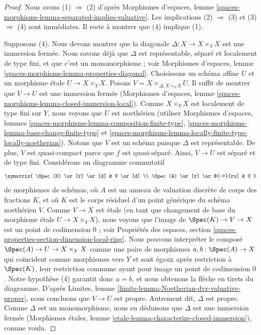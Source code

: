 \begin{proof}
Nous avons (1) $\Rightarrow$ (2) d'après
Morphismes d'espaces, lemme
\ref{spaces-morphisms-lemma-separated-implies-valuative}.
Les implications (2) $\Rightarrow$ (3) et (3) $\Rightarrow$ (4)
sont immédiates. Il reste à montrer que (4) implique (1).

\medskip\noindent
Supposons (4). Nous devons montrer que la diagonale
$\Delta : X \to X \times_Y X$ est une immersion
fermée. Nous savons déjà que $\Delta$ est représentable, séparé et
localement de type fini, et que c'est un monomorphisme ; voir Morphismes d'espaces, lemme
\ref{spaces-morphisms-lemma-properties-diagonal}.
Choisissons un schéma affine $U$ et un morphisme \'etale
$U \to X \times_Y X$. Posons $V = X \times_{\Delta, X \times_Y X} U$.
Il suffit de montrer que $V \to U$ est une immersion fermée
(Morphismes d'espaces, lemme
\ref{spaces-morphisms-lemma-closed-immersion-local}).
Comme $X \times_Y X$ est localement de type fini sur $Y$, nous voyons que
$U$ est noethérien (utiliser Morphismes d'espaces, lemmes
\ref{spaces-morphisms-lemma-composition-finite-type},
\ref{spaces-morphisms-lemma-base-change-finite-type} et
\ref{spaces-morphisms-lemma-locally-finite-type-locally-noetherian}).
Notons que $V$ est un schéma puisque $\Delta$ est représentable.
De plus, $V$ est quasi-compact parce que $f$ est quasi-séparé.
Ainsi, $V \to U$ est séparé et de type fini. Considérons un diagramme commutatif
$$
\xymatrix{
\Spec(K) \ar[r] \ar[d] & V \ar[d] \\
\Spec(A) \ar[r] \ar@{-->}[ru] & U
}
$$
de morphismes de schémas, où $A$ est un anneau de valuation discrète
de corps des fractions $K$, et où $K$ est le corps résiduel
d'un point générique du schéma noethérien $V$. Comme $V \to X$
est \'etale (en tant que changement de base du morphisme \'etale $U \to X \times_Y X$),
nous voyons que l'image de $\Spec(K) \to V \to X$ est un point de
codimension $0$ ; voir Propriétés des espaces, section
\ref{spaces-properties-section-dimension-local-ring}.
Nous pouvons interpréter le composé $\Spec(A) \to U \to X \times_Y X$
comme une paire de morphismes $a, b : \Spec(A) \to X$ qui coïncident comme morphismes
vers $Y$ et sont égaux après restriction à $\Spec(K)$, leur restriction commune
ayant pour image un point de codimension $0$. Notre hypothèse
(4) garantit donc $a = b$, et nous obtenons la flèche en tirets du diagramme.
D'après Limites, lemme \ref{limits-lemma-Noetherian-dvr-valuative-proper},
nous concluons que $V \to U$ est propre. Autrement dit, $\Delta$ est propre.
Comme $\Delta$ est un monomorphisme, nous en déduisons que $\Delta$ est une
immersion fermée (Morphismes \'etales, lemme
\ref{etale-lemma-characterize-closed-immersion}), comme voulu.
\end{proof}

